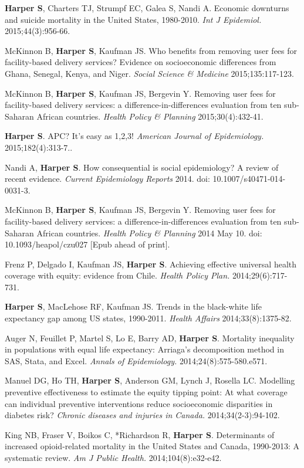 \documentclass[
  letterpaper,
  DIV=11,
  numbers=noendperiod]{scrartcl}
\begin{document}
\textbf{Harper S}, Charters TJ, Strumpf EC, Galea S, Nandi A. Economic
downturns and suicide mortality in the United States, 1980-2010.
\emph{Int J Epidemiol.} 2015;44(3):956-66.

McKinnon B, \textbf{Harper S}, Kaufman JS. Who benefits from removing
user fees for facility-based delivery services? Evidence on
socioeconomic differences from Ghana, Senegal, Kenya, and Niger.
\emph{Social Science \& Medicine} 2015;135:117-123.

McKinnon B, \textbf{Harper S}, Kaufman JS, Bergevin Y. Removing user
fees for facility-based delivery services: a difference-in-differences
evaluation from ten sub-Saharan African countries. \emph{Health Policy
\& Planning} 2015;30(4):432-41.

\textbf{Harper S}. APC? It's easy as 1,2,3! \emph{American Journal of
Epidemiology.} 2015;182(4):313-7..

Nandi A, \textbf{Harper S}. How consequential is social epidemiology? A
review of recent evidence. \emph{Current Epidemiology Reports} 2014.
doi: 10.1007/s40471-014-0031-3.

McKinnon B, \textbf{Harper S}, Kaufman JS, Bergevin Y. Removing user
fees for facility-based delivery services: a difference-in-differences
evaluation from ten sub-Saharan African countries. \emph{Health Policy
\& Planning} 2014 May 10. doi: 10.1093/heapol/czu027 {[}Epub ahead of
print{]}.

Frenz P, Delgado I, Kaufman JS, \textbf{Harper S}. Achieving effective
universal health coverage with equity: evidence from Chile. \emph{Health
Policy Plan.} 2014;29(6):717-731.

\textbf{Harper S}, MacLehose RF, Kaufman JS. Trends in the black-white
life expectancy gap among US states, 1990-2011. \emph{Health Affairs}
2014;33(8):1375-82.

Auger N, Feuillet P, Martel S, Lo E, Barry AD, \textbf{Harper S}.
Mortality inequality in populations with equal life expectancy:
Arriaga's decomposition method in SAS, Stata, and Excel. \emph{Annals of
Epidemiology.} 2014;24(8):575-580.e571.

Manuel DG, Ho TH, \textbf{Harper S}, Anderson GM, Lynch J, Rosella LC.
Modelling preventive effectiveness to estimate the equity tipping point:
At what coverage can individual preventive interventions reduce
socioeconomic disparities in diabetes risk? \emph{Chronic diseases and
injuries in Canada.} 2014;34(2-3):94-102.

King NB, Fraser V, Boikos C, *Richardson R, \textbf{Harper S}.
Determinants of increased opioid-related mortality in the United States
and Canada, 1990-2013: A systematic review. \emph{Am J Public Health.}
2014;104(8):e32-e42.
\end{document}
